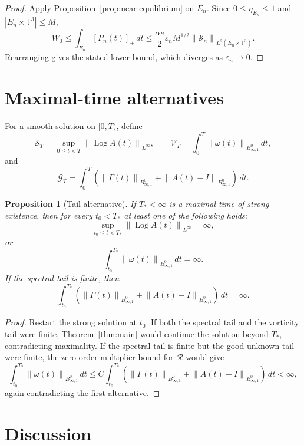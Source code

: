\documentclass[11pt]{article}
\numberwithin{equation}{section}
\newtheorem{proposition}[theorem]{Proposition}
\newcommand{\T}{\mathbb T}
\newcommand{\Id}{I}
\newcommand{\Log}{\operatorname{Log}}
\newcommand{\Besov}{B^0_{\infty,1}}
\newcommand{\calS}{\mathcal S}
\newcommand{\calR}{\mathcal R}
\newcommand{\norm}[1]{\left\lVert #1\right\rVert}
\begin{document}
\begin{proof}
Apply Proposition~\ref{prop:near-equilibrium} on \(E_n\).  Since
\(0\le\eta_{E_n}\le1\) and \(|E_n\times\T^3|\le M\),
\[
  W_0
  \le
  \int_{E_n}[P_n(t)]_+\,dt
  \le
  \frac{\alpha e}{2}
  \varepsilon_n M^{1/2}
  \norm{\calS_n}_{L^2(E_n\times\T^3)} .
\]
Rearranging gives the stated lower bound, which diverges as
\(\varepsilon_n\to0\).
\end{proof}

\section{Maximal-time alternatives}

For a smooth solution on \([0,T)\), define
\[
  \mathcal S_T=\sup_{0\le t<T}\norm{\Log A(t)}_{L^\infty},\qquad
  \mathcal V_T=\int_0^T\norm{\omega(t)}_{\Besov}\,dt,
\]
and
\[
  \mathcal G_T=
  \int_0^T
  \left(\norm{\Gamma(t)}_{\Besov}+\norm{A(t)-\Id}_{\Besov}\right)\,dt .
\]

\begin{proposition}[Tail alternative]
If \(T_*<\infty\) is a maximal time of strong existence, then for every
\(t_0<T_*\) at least one of the following holds:
\[
  \sup_{t_0\le t<T_*}\norm{\Log A(t)}_{L^\infty}=\infty,
\]
or
\[
  \int_{t_0}^{T_*}\norm{\omega(t)}_{\Besov}\,dt=\infty .
\]
If the spectral tail is finite, then
\[
  \int_{t_0}^{T_*}
  \left(\norm{\Gamma(t)}_{\Besov}+\norm{A(t)-\Id}_{\Besov}\right)\,dt=\infty .
\]
\end{proposition}

\begin{proof}
Restart the strong solution at \(t_0\).  If both the spectral tail and the
vorticity tail were finite, Theorem~\ref{thm:main} would continue the solution
beyond \(T_*\), contradicting maximality.  If the spectral tail is finite but
the good-unknown tail were finite, the zero-order multiplier bound for
\(\calR\) would give
\[
  \int_{t_0}^{T_*}\norm{\omega(t)}_{\Besov}\,dt
  \le
  C\int_{t_0}^{T_*}
  \left(\norm{\Gamma(t)}_{\Besov}
  +\norm{A(t)-\Id}_{\Besov}\right)\,dt
  <\infty,
\]
again contradicting the first alternative.
\end{proof}

\section{Discussion}
\end{document}
